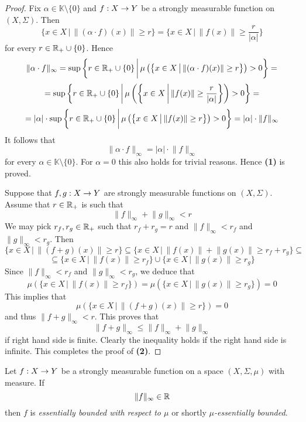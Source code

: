 \begin{proof}
    Fix $\alpha \in \mathbb{K}\setminus \{0\}$ and $f:X\rightarrow Y$ be a strongly measurable function on $(X,\Sigma)$. Then
    $$\{x\in X\,\big|\,\lVert (\alpha \cdot f)(x)\rVert \geq r\big\} = \bigg\{x\in X\,\bigg|\,\lVert f(x)\rVert \geq \frac{r}{|\alpha|}\bigg\}$$
    for every $r \in {\mathbb R}_+\cup \{0\}$. Hence
    $$\lVert \alpha \cdot f\rVert_{\infty} = \sup \bigg\{r\in {\mathbb R}_+\cup \{0\}\,\bigg|\,\mu\left(\big\{x\in X\,\big|\,\lVert (\alpha \cdot f)(x)\rVert \geq r\big\}\right) > 0\bigg\} =$$
    $$= \sup \bigg\{r \in {\mathbb R}_+\cup \{0\}\,\bigg|\,\mu\left(\bigg\{x\in X\,\bigg|\,\lVert f(x)\rVert \geq \frac{r}{|\alpha|}\bigg\}\right) > 0\bigg\} = $$
    $$= |\alpha| \cdot \sup \bigg\{r \in {\mathbb R}_+\cup \{0\}\,\bigg|\,\mu\left(\big\{x\in X\,\big|\,\lVert f(x)\rVert \geq r\big\}\right) > 0\bigg\} = |\alpha|\cdot \lVert f\rVert_{\infty}$$
    It follows that
    $$\lVert \alpha \cdot f\rVert_{\infty} = |\alpha|\cdot \lVert f\rVert_{\infty}$$
    for every $\alpha \in \mathbb{K}\setminus \{0\}$. For $\alpha = 0$ this also holds for trivial reasons. Hence \textbf{(1)} is proved.

    Suppose that $f,g:X\rightarrow Y$ are strongly measurable functions on $(X,\Sigma)$. Assume that $r\in {\mathbb R}_+$ is such that
    $$\lVert f \rVert_{\infty} + \lVert g \rVert_{\infty} < r$$
    We may pick $r_f,r_g\in {\mathbb R}_+$ such that $r_f+r_g = r$ and $\lVert f \rVert_{\infty} < r_f$ and $\lVert g \rVert_{\infty} < r_g$. Then
    $$\{x\in X\,\big|\,\lVert (f + g)(x)\rVert \geq r\big\} \subseteq \big\{x\in X\,\big|\,\lVert f(x)\rVert + \lVert g(x)\rVert \geq r_f + r_g\big\} \subseteq $$
    $$\subseteq \big\{x\in X\,\big|\,\lVert f(x)\rVert  \geq r_f\big\} \cup \big\{x\in X\,\big|\,\lVert g(x)\rVert  \geq r_g\big\}$$
    Since $\lVert f \rVert_{\infty} < r_f$ and $\lVert g \rVert_{\infty} < r_g$, we deduce that
    $$\mu\left(\big\{x\in X\,\big|\,\lVert f(x)\rVert  \geq r_f\big\}\right) = \mu\left(\big\{x\in X\,\big|\,\lVert g(x)\rVert  \geq r_g\big\}\right) = 0$$
    This implies that
    $$\mu\left(\{x\in X\,\big|\,\lVert (f + g)(x)\rVert \geq r\big\}\right) = 0$$
    and thus $\lVert f + g\rVert_{\infty} < r$. This proves that
    $$\lVert f + g \rVert_{\infty} \leq \lVert f \rVert_{\infty} + \lVert g \rVert_{\infty}$$
    if right hand side is finite. Clearly the inequality holds if the right hand side is infinite. This completes the proof of \textbf{(2)}.
\end{proof}

\begin{definition}
    Let $f:X\rightarrow Y$ be a strongly measurable function on a space $(X,\Sigma,\mu)$ with measure. If
    $$\lVert f \rVert_{\infty} \in {\mathbb R}$$
    then $f$ is \textit{essentially bounded with respect to $\mu$} or shortly \textit{$\mu$-essentially bounded}.
\end{definition}

